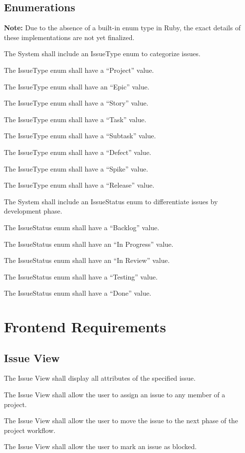 \documentclass[12pt]{report}
\begin{document}
     \subsection{Enumerations}
		\textbf{Note:} Due to the absence of a built-in enum type in Ruby, the exact details of these implementations are not yet finalized.
		\begin{reqlist}
			\item The System shall include an IssueType enum to categorize issues.
			\begin{reqlist}
				\item The IssueType enum shall have a ``Project'' value.
				\item The IssueType enum shall have an ``Epic'' value.
				\item The IssueType enum shall have a ``Story'' value.
				\item The IssueType enum shall have a ``Task'' value.
				\item The IssueType enum shall have a ``Subtask'' value.
				\item The IssueType enum shall have a ``Defect'' value.
				\item The IssueType enum shall have a ``Spike'' value.
				\item The IssueType enum shall have a ``Release'' value.
			\end{reqlist}
			\item The System shall include an IssueStatus enum to differentiate issues by development phase.
			\begin{reqlist}
				\item The IssueStatus enum shall have a ``Backlog'' value.
				\item The IssueStatus enum shall have an ``In Progress'' value.
				\item The IssueStatus enum shall have an ``In Review'' value.
				\item The IssueStatus enum shall have a ``Testing'' value.
				\item The IssueStatus enum shall have a ``Done'' value.
			\end{reqlist}
		\end{reqlist}
\section{Frontend Requirements}
	\subsection{Issue View}
		\begin{reqlist}
			\item The Issue View shall display all attributes of the specified issue.
			\item The Issue View shall allow the user to assign an issue to any member of a project.
			\item The Issue View shall allow the user to move the issue to the next phase of the project workflow.
			\item The Issue View shall allow the user to mark an issue as blocked.
		\end{reqlist}
\end{document}
